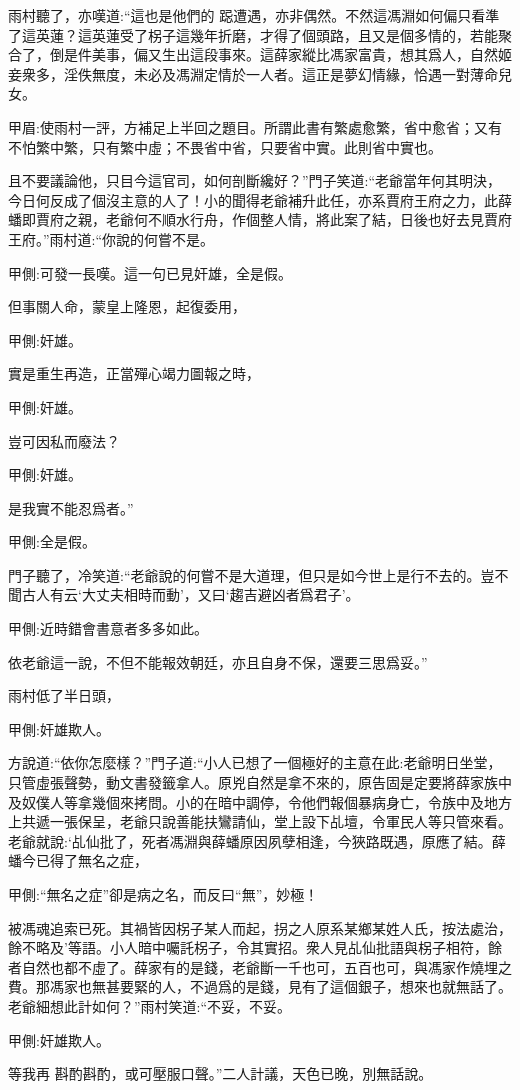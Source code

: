 \begin{parag}
    雨村聽了，亦嘆道:“這也是他們的 跽遭遇，亦非偶然。不然這馮淵如何偏只看準了這英蓮？這英蓮受了柺子這幾年折磨，才得了個頭路，且又是個多情的，若能聚合了，倒是件美事，偏又生出這段事來。這薛家縱比馮家富貴，想其爲人，自然姬妾衆多，淫佚無度，未必及馮淵定情於一人者。這正是夢幻情緣，恰遇一對薄命兒女。\begin{note}甲眉:使雨村一評，方補足上半回之題目。所謂此書有繁處愈繁，省中愈省；又有不怕繁中繁，只有繁中虛；不畏省中省，只要省中實。此則省中實也。\end{note}且不要議論他，只目今這官司，如何剖斷纔好？”門子笑道:“老爺當年何其明決，今日何反成了個沒主意的人了！小的聞得老爺補升此任，亦系賈府王府之力，此薛蟠即賈府之親，老爺何不順水行舟，作個整人情，將此案了結，日後也好去見賈府王府。”雨村道:“你說的何嘗不是。\begin{note}甲側:可發一長嘆。這一句已見奸雄，全是假。\end{note}但事關人命，蒙皇上隆恩，起復委用，\begin{note}甲側:奸雄。\end{note}實是重生再造，正當殫心竭力圖報之時，\begin{note}甲側:奸雄。\end{note}豈可因私而廢法？\begin{note}甲側:奸雄。\end{note}是我實不能忍爲者。”\begin{note}甲側:全是假。\end{note}門子聽了，冷笑道:“老爺說的何嘗不是大道理，但只是如今世上是行不去的。豈不聞古人有云‘大丈夫相時而動’，又曰‘趨吉避凶者爲君子’。\begin{note}甲側:近時錯會書意者多多如此。\end{note}依老爺這一說，不但不能報效朝廷，亦且自身不保，還要三思爲妥。”
\end{parag}


\begin{parag}
    雨村低了半日頭，\begin{note}甲側:奸雄欺人。\end{note}方說道:“依你怎麼樣？”門子道:“小人已想了一個極好的主意在此:老爺明日坐堂，只管虛張聲勢，動文書發籤拿人。原兇自然是拿不來的，原告固是定要將薛家族中及奴僕人等拿幾個來拷問。小的在暗中調停，令他們報個暴病身亡，令族中及地方上共遞一張保呈，老爺只說善能扶鸞請仙，堂上設下乩壇，令軍民人等只管來看。老爺就說:‘乩仙批了，死者馮淵與薛蟠原因夙孽相逢，今狹路既遇，原應了結。薛蟠今已得了無名之症，\begin{note}甲側:“無名之症”卻是病之名，而反曰“無”，妙極！\end{note}被馮魂追索已死。其禍皆因柺子某人而起，拐之人原系某鄉某姓人氏，按法處治，餘不略及’等語。小人暗中囑託柺子，令其實招。衆人見乩仙批語與柺子相符，餘者自然也都不虛了。薛家有的是錢，老爺斷一千也可，五百也可，與馮家作燒埋之費。那馮家也無甚要緊的人，不過爲的是錢，見有了這個銀子，想來也就無話了。老爺細想此計如何？”雨村笑道:“不妥，不妥。\begin{note}甲側:奸雄欺人。\end{note}等我再 斟酌斟酌，或可壓服口聲。”二人計議，天色已晚，別無話說。
\end{parag}


